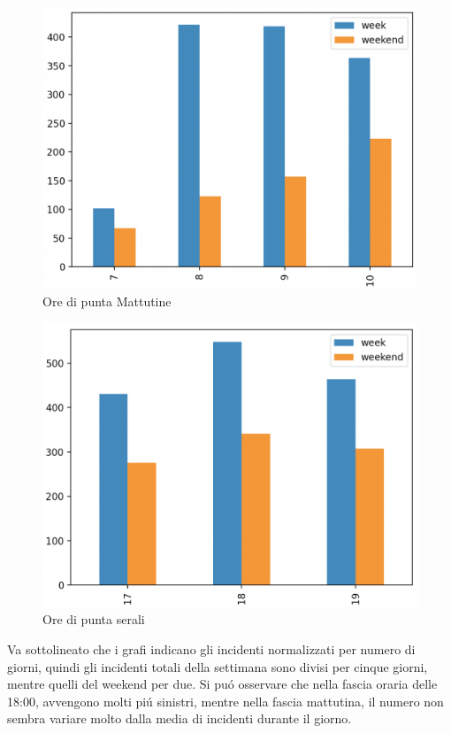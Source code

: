 \documentclass[a4paper]{report}
\begin{document}
\begin{figure}
\includegraphics[width=\linewidth]{../src/incidenti/incidenti_senza_coords/ore_punta/ore_punta_mattina.png}
\caption{Ore di punta Mattutine}
\label{fig:punta_mattina}
\end{figure}

\begin{figure}
    \includegraphics[width=\linewidth]{../src/incidenti/incidenti_senza_coords/ore_punta/ore_punta_sera.png}
    \caption{Ore di punta serali}
    \label{fig:punta_sera}
\end{figure}


Va sottolineato che i grafi indicano gli incidenti normalizzati per numero di 
giorni, 
quindi gli incidenti totali della settimana sono divisi per cinque giorni, 
mentre quelli del weekend per due.
Si pu\'o osservare che nella fascia oraria delle 18:00, 
avvengono molti pi\'u sinistri, mentre nella fascia mattutina, 
il numero non sembra variare molto dalla media di incidenti durante il giorno.
\end{document}
